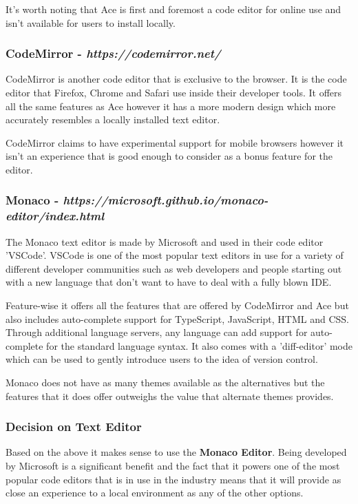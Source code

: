 It's worth noting that Ace is first and foremost a code editor for online use and isn't available for users to install locally.

\subsubsection{CodeMirror - \textit{https://codemirror.net/}}

CodeMirror is another code editor that is exclusive to the browser. It is the code editor that Firefox, Chrome and Safari use inside their developer tools. It offers all the same features as Ace however it has a more modern design which more accurately resembles a locally installed text editor.

CodeMirror claims to have experimental support for mobile browsers however it isn't an experience that is good enough to consider as a bonus feature for the editor.

\subsubsection{Monaco - \textit{https://microsoft.github.io/monaco-editor/index.html}}

The Monaco text editor is made by Microsoft and used in their code editor 'VSCode'. VSCode is one of the most popular text editors in use for a variety of different developer communities such as web developers and people starting out with a new language that don't want to have to deal with a fully blown IDE.

Feature-wise it offers all the features that are offered by CodeMirror and Ace but also includes auto-complete support for TypeScript, JavaScript, HTML and CSS. Through additional language servers, any language can add support for auto-complete for the standard language syntax. It also comes with a 'diff-editor' mode which can be used to gently introduce users to the idea of version control.

Monaco does not have as many themes available as the alternatives but the features that it does offer outweighs the value that alternate themes provides.

\subsubsection{Decision on Text Editor}

Based on the above it makes sense to use the \textbf{Monaco Editor}. Being developed by Microsoft is a significant benefit and the fact that it powers one of the most popular code editors that is in use in the industry means that it will provide as close an experience to a local environment as any of the other options.

